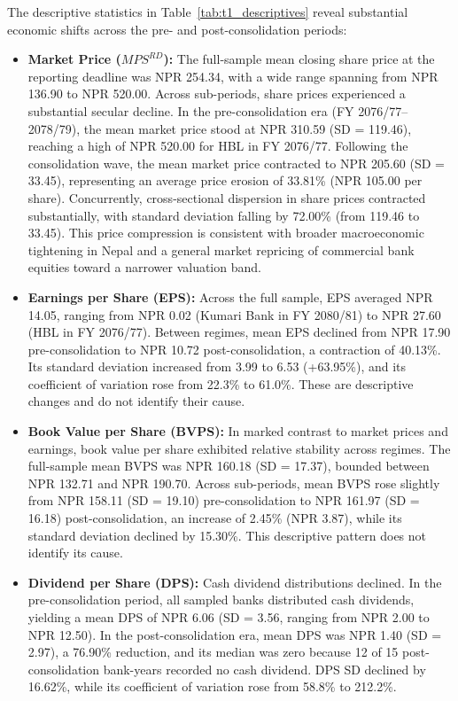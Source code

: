 The descriptive statistics in Table~\ref{tab:t1_descriptives} reveal substantial economic shifts across the pre- and post-consolidation periods:
\begin{itemize}
    \item \textbf{Market Price ($\mathit{MPS}^{RD}$):} The full-sample mean closing share price at the reporting deadline was NPR 254.34, with a wide range spanning from NPR 136.90 to NPR 520.00. Across sub-periods, share prices experienced a substantial secular decline. In the pre-consolidation era (FY 2076/77--2078/79), the mean market price stood at NPR 310.59 (SD = 119.46), reaching a high of NPR 520.00 for HBL in FY 2076/77. Following the consolidation wave, the mean market price contracted to NPR 205.60 (SD = 33.45), representing an average price erosion of 33.81\% (NPR 105.00 per share). Concurrently, cross-sectional dispersion in share prices contracted substantially, with standard deviation falling by 72.00\% (from 119.46 to 33.45). This price compression is consistent with broader macroeconomic tightening in Nepal and a general market repricing of commercial bank equities toward a narrower valuation band.
    \item \textbf{Earnings per Share (EPS):} Across the full sample, EPS averaged NPR 14.05, ranging from NPR 0.02 (Kumari Bank in FY 2080/81) to NPR 27.60 (HBL in FY 2076/77). Between regimes, mean EPS declined from NPR 17.90 pre-consolidation to NPR 10.72 post-consolidation, a contraction of 40.13\%. Its standard deviation increased from 3.99 to 6.53 (+63.95\%), and its coefficient of variation rose from 22.3\% to 61.0\%. These are descriptive changes and do not identify their cause.
    \item \textbf{Book Value per Share (BVPS):} In marked contrast to market prices and earnings, book value per share exhibited relative stability across regimes. The full-sample mean BVPS was NPR 160.18 (SD = 17.37), bounded between NPR 132.71 and NPR 190.70. Across sub-periods, mean BVPS rose slightly from NPR 158.11 (SD = 19.10) pre-consolidation to NPR 161.97 (SD = 16.18) post-consolidation, an increase of 2.45\% (NPR 3.87), while its standard deviation declined by 15.30\%. This descriptive pattern does not identify its cause.
    \item \textbf{Dividend per Share (DPS):} Cash dividend distributions declined. In the pre-consolidation period, all sampled banks distributed cash dividends, yielding a mean DPS of NPR 6.06 (SD = 3.56, ranging from NPR 2.00 to NPR 12.50). In the post-consolidation era, mean DPS was NPR 1.40 (SD = 2.97), a 76.90\% reduction, and its median was zero because 12 of 15 post-consolidation bank-years recorded no cash dividend. DPS SD declined by 16.62\%, while its coefficient of variation rose from 58.8\% to 212.2\%.

\end{itemize}
